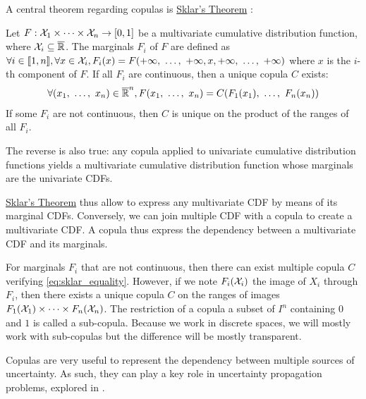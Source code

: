 A central theorem regarding copulas is \hyperref[theorem:sklar]{Sklar's Theorem} \cite{sklar_fonctions_1959}:
\begin{theorem}\label{theorem:sklar}
    Let $F:\mathcal{X}_1\times\dots\times\mathcal{X}_n\rightarrow[0,1]$ be a multivariate cumulative distribution function, where $\mathcal{X}_i\subseteq\overline{\mathbb{R}}$. The marginals $F_i$ of $F$ are defined as $\forall i\in[\![ 1,n]\!] , \forall x\in\mathcal{X}_i, F_i(x) = F( +\infty, ~\dots, ~  +\infty, x,  +\infty, ~\dots, ~ +\infty)$ where $x$ is the $i$-th component of $F$. If all $F_i$ are continuous, then a unique copula $C$ exists:
    \begin{align}
        \forall (x_1, ~\dots, ~ x_n)\in \overline{\mathbb{R}}^n, F(x_1, ~\dots, ~ x_n)=C(F_1(x_1), ~\dots, ~ F_n(x_n))\label{eq:sklar_equality}
    \end{align}
    If some $F_i$ are not continuous, then $C$ is unique on the product of the ranges of all $F_i$.
    
    The reverse is also true: any copula applied to univariate cumulative distribution functions yields a multivariate cumulative distribution function whose marginals are the univariate CDFs.
\end{theorem}
\hyperref[theorem:sklar]{Sklar's Theorem} thus allow to express any multivariate CDF by means of its marginal CDFs. Conversely, we can join multiple CDF with a copula to create a multivariate CDF. A copula thus express the dependency between a multivariate CDF and its marginals.
 
\begin{remark}
    For marginals $F_i$ that are not continuous, then there can exist multiple copula $C$ verifying \cref{eq:sklar_equality}. However, if we note $F_i(\mathcal{X}_i)$ the image of $X_i$ through $F_i$, then there exists a unique copula $C$ on the ranges of images $F_1(\mathcal{X}_1)\times\dots\times F_n(\mathcal{X}_n)$. The restriction of a copula  a subset of $I^n$ containing $0$ and $1$ is called a sub-copula. Because we work in discrete spaces, we will mostly work with sub-copulas but the difference will be mostly transparent.
\end{remark}

Copulas are very useful to represent the dependency  between multiple sources of uncertainty. As such, they can play a key role in uncertainty propagation problems, explored in .

